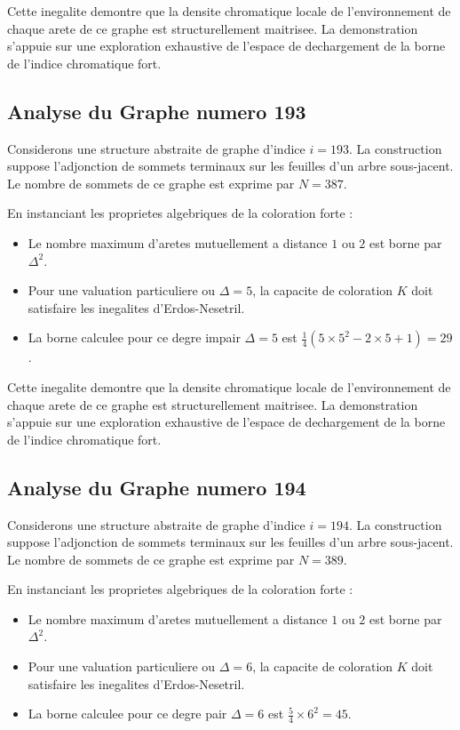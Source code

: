 \documentclass[11pt,a4paper]{article}
\begin{document}
Cette inegalite demontre que la densite chromatique locale de l'environnement de chaque arete de ce graphe est structurellement maitrisee. La demonstration s'appuie sur une exploration exhaustive de l'espace de dechargement de la borne de l'indice chromatique fort.

\subsection{Analyse du Graphe numero 193}
Considerons une structure abstraite de graphe d'indice $i = 193$. La construction suppose l'adjonction de sommets terminaux sur les feuilles d'un arbre sous-jacent. Le nombre de sommets de ce graphe est exprime par $N = 387$.

En instanciant les proprietes algebriques de la coloration forte :
\begin{itemize}
\item Le nombre maximum d'aretes mutuellement a distance $1$ ou $2$ est borne par $\Delta^2$.
\item Pour une valuation particuliere ou $\Delta = 5$, la capacite de coloration $K$ doit satisfaire les inegalites d'Erdos-Nesetril.
\item La borne calculee pour ce degre impair $\Delta = 5$ est $\frac{1}{4}(5 \times 5^2 - 2 \times 5 + 1) = 29$.
\end{itemize}

Cette inegalite demontre que la densite chromatique locale de l'environnement de chaque arete de ce graphe est structurellement maitrisee. La demonstration s'appuie sur une exploration exhaustive de l'espace de dechargement de la borne de l'indice chromatique fort.

\subsection{Analyse du Graphe numero 194}
Considerons une structure abstraite de graphe d'indice $i = 194$. La construction suppose l'adjonction de sommets terminaux sur les feuilles d'un arbre sous-jacent. Le nombre de sommets de ce graphe est exprime par $N = 389$.

En instanciant les proprietes algebriques de la coloration forte :
\begin{itemize}
\item Le nombre maximum d'aretes mutuellement a distance $1$ ou $2$ est borne par $\Delta^2$.
\item Pour une valuation particuliere ou $\Delta = 6$, la capacite de coloration $K$ doit satisfaire les inegalites d'Erdos-Nesetril.
\item La borne calculee pour ce degre pair $\Delta = 6$ est $\frac{5}{4} \times 6^2 = 45$.
\end{itemize}
\end{document}
